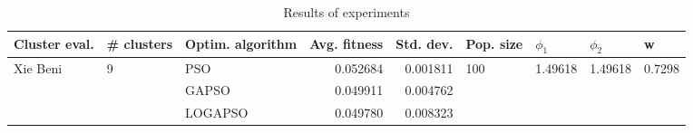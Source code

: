 \begin{table}
\centering
\caption{Results of experiments}
\begin{tabular}{lllrrllll}
\toprule
            Cluster eval. &        \# clusters & Optim. algorithm &  Avg. fitness &  Std. dev. &            Pop. size &               $\phi_{1}$ &               $\phi_{2}$ &                       w \\
\midrule
\multirow{3}{*}{Xie Beni} & \multirow{3}{*}{9} &              PSO &      0.052684 &   0.001811 & \multirow{3}{*}{100} & \multirow{3}{*}{1.49618} & \multirow{3}{*}{1.49618} & \multirow{3}{*}{0.7298} \\
                          &                    &            GAPSO &      0.049911 &   0.004762 &                      &                          &                          &                         \\
                          &                    &          LOGAPSO &      0.049780 &   0.008323 &                      &                          &                          &                         \\
\bottomrule
\end{tabular}
\end{table}
